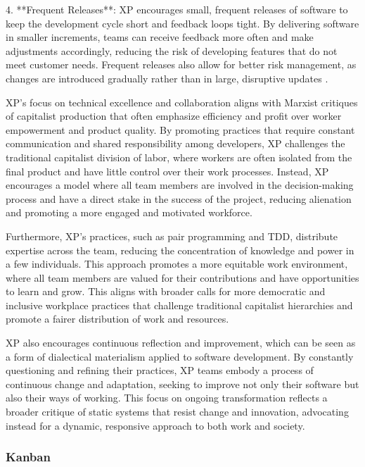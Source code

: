 \begin{refsection}
4. **Frequent Releases**: XP encourages small, frequent releases of software to keep the development cycle short and feedback loops tight. By delivering software in smaller increments, teams can receive feedback more often and make adjustments accordingly, reducing the risk of developing features that do not meet customer needs. Frequent releases also allow for better risk management, as changes are introduced gradually rather than in large, disruptive updates \cite[pp.~1-5]{beck2021extreme}.

XP’s focus on technical excellence and collaboration aligns with Marxist critiques of capitalist production that often emphasize efficiency and profit over worker empowerment and product quality. By promoting practices that require constant communication and shared responsibility among developers, XP challenges the traditional capitalist division of labor, where workers are often isolated from the final product and have little control over their work processes. Instead, XP encourages a model where all team members are involved in the decision-making process and have a direct stake in the success of the project, reducing alienation and promoting a more engaged and motivated workforce.

Furthermore, XP’s practices, such as pair programming and TDD, distribute expertise across the team, reducing the concentration of knowledge and power in a few individuals. This approach promotes a more equitable work environment, where all team members are valued for their contributions and have opportunities to learn and grow. This aligns with broader calls for more democratic and inclusive workplace practices that challenge traditional capitalist hierarchies and promote a fairer distribution of work and resources.

XP also encourages continuous reflection and improvement, which can be seen as a form of dialectical materialism applied to software development. By constantly questioning and refining their practices, XP teams embody a process of continuous change and adaptation, seeking to improve not only their software but also their ways of working. This focus on ongoing transformation reflects a broader critique of static systems that resist change and innovation, advocating instead for a dynamic, responsive approach to both work and society.

\subsubsection{Kanban}


\end{refsection}
